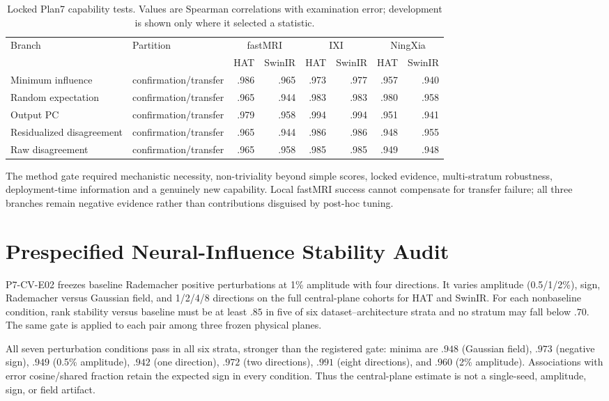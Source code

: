 \documentclass[10pt,twocolumn,letterpaper]{article}
\begin{document}
\begin{table}[t]
\centering
\caption{Locked Plan7 capability tests. Values are Spearman correlations with examination error; development is shown only where it selected a statistic.}
\label{tab:s_p7_gates}
\setlength{\tabcolsep}{4pt}
\begin{tabular}{llrrrrrr}
\toprule
Branch&Partition&\multicolumn{2}{c}{fastMRI}&\multicolumn{2}{c}{IXI}&\multicolumn{2}{c}{NingXia}\\
&&HAT&SwinIR&HAT&SwinIR&HAT&SwinIR\\
\midrule
Minimum influence&confirmation/transfer&.986&.965&.973&.977&.957&.940\\
Random expectation&confirmation/transfer&.965&.944&.983&.983&.980&.958\\
Output PC&confirmation/transfer&.979&.958&.994&.994&.951&.941\\
Residualized disagreement&confirmation/transfer&.965&.944&.986&.986&.948&.955\\
Raw disagreement&confirmation/transfer&.965&.958&.985&.985&.949&.948\\
\bottomrule
\end{tabular}
\end{table}

The method gate required mechanistic necessity, non-triviality beyond simple scores, locked evidence, multi-stratum robustness, deployment-time information and a genuinely new capability. Local fastMRI success cannot compensate for transfer failure; all three branches remain negative evidence rather than contributions disguised by post-hoc tuning.

\section{Prespecified Neural-Influence Stability Audit}
P7-CV-E02 freezes baseline Rademacher positive perturbations at 1\% amplitude with four directions. It varies amplitude (0.5/1/2\%), sign, Rademacher versus Gaussian field, and 1/2/4/8 directions on the full central-plane cohorts for HAT and SwinIR. For each nonbaseline condition, rank stability versus baseline must be at least $.85$ in five of six dataset--architecture strata and no stratum may fall below $.70$. The same gate is applied to each pair among three frozen physical planes.

All seven perturbation conditions pass in all six strata, stronger than the registered gate: minima are $.948$ (Gaussian field), $.973$ (negative sign), $.949$ (0.5\% amplitude), $.942$ (one direction), $.972$ (two directions), $.991$ (eight directions), and $.960$ (2\% amplitude). Associations with error cosine/shared fraction retain the expected sign in every condition. Thus the central-plane estimate is not a single-seed, amplitude, sign, or field artifact.
\end{document}
